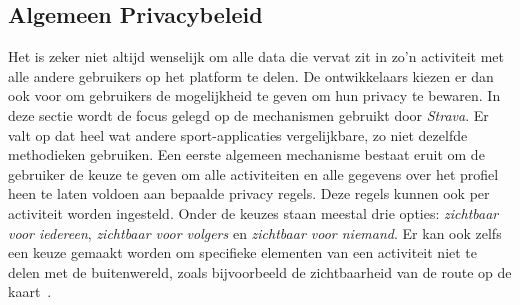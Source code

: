 \subsection{Algemeen Privacybeleid}\label{sec:Algemene Privacy}
Het is zeker niet altijd wenselijk om alle data die vervat zit in zo'n
activiteit met alle andere gebruikers op het platform te delen. De
ontwikkelaars kiezen er dan ook voor om gebruikers de mogelijkheid te geven om
hun privacy te bewaren. In deze sectie wordt de focus gelegd op de mechanismen
gebruikt door \textit{Strava}. Er valt op dat heel wat andere sport-applicaties
vergelijkbare, zo niet dezelfde methodieken gebruiken. Een eerste algemeen
mechanisme bestaat eruit om de gebruiker de keuze te geven om alle activiteiten
en alle gegevens over het profiel heen te laten voldoen aan bepaalde privacy
regels. Deze regels kunnen ook per activiteit worden ingesteld. Onder de keuzes
staan meestal drie opties: \textit{zichtbaar voor iedereen}, \textit{zichtbaar
    voor volgers} en \textit{zichtbaar voor niemand}. Er kan ook zelfs een keuze
gemaakt worden om specifieke elementen van een activiteit niet te delen met de
buitenwereld, zoals bijvoorbeeld de zichtbaarheid van de route op de
kaart~\cite{Activity24:online}.

